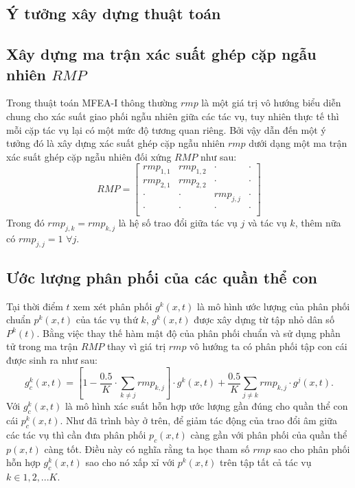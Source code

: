 \subsection{Ý tưởng xây dựng thuật toán}
\label{section:idea}
\subsection{Xây dựng ma trận xác suất ghép cặp ngẫu nhiên $RMP$}

Trong thuật toán MFEA-I thông thường $rmp$ là một giá trị vô hướng biểu diễn chung cho xác suất giao phối ngẫu nhiên giữa các tác vụ, tuy nhiên thực tế thì mỗi cặp tác vụ lại có một mức độ tương quan riêng. Bởi vậy dẫn đến một ý tưởng đó là xây dựng xác suất ghép cặp ngẫu nhiên $rmp$ dưới dạng một ma trận xác suất ghép cặp ngẫu nhiên đối xứng $RMP$ như sau:
\begin{equation}
    RMP =
    \begin{bmatrix}
        rmp_{1,1} & rmp_{1,2} & \cdot & \cdot \\
        rmp_{2,1} & rmp_{2,2} & \cdot & \cdot \\
        \cdot & \cdot & rmp_{j,j} & \cdot \\
        \cdot & \cdot & \cdot & \cdot \\
    \end{bmatrix}
\end{equation}
Trong đó $rmp_{j,k} = rmp_{k,j}$ là hệ số trao đổi giữa tác vụ $j$ và tác vụ $k$, thêm nữa có $rmp_{j,j} = 1$ $\forall j$. 
\subsection{Ước lượng phân phối của các quần thể con}
Tại thời điểm $t$ xem xét phân phối $g^k(x,t)$ là mô hình ước lượng của phân phối chuẩn $p^k(x,t)$ của tác vụ thứ $k$, $g^k(x,t)$ được xây dựng từ tập nhỏ dân số $P^k(t)$. Bằng việc thay thế hàm mật độ của phân phối chuẩn và sử dụng phần tử trong ma trận $RMP$ thay vì giá trị $rmp$ vô hướng ta có phân phối tập con cái được sinh ra như sau:
\begin{equation}
    g_c^k(x,t) = [1 - \frac{0.5}{K}\cdot \sum_{k \neq j}rmp_{k,j}] \cdot g^k(x,t) + \frac{0.5}{K} \sum_{j \neq k} rmp_{k,j} \cdot g^j(x,t).
    \label{equa:true_distribution}
\end{equation}
Với $g_c^k(x,t)$ là mô hình xác suất hỗn hợp ước lượng gần đúng cho quần thể con cái $p_c^k(x,t)$. Như đã trình bày ở trên, để giảm tác động của trao đổi âm giữa các tác vụ thì cần đưa phân phối $p_c(x,t)$ càng gần với phân phối của quần thể $p(x,t)$ càng tốt. Điều này có nghĩa rằng ta học tham số $rmp$ sao cho phân phối hỗn hợp $g_c^k(x,t)$ sao cho nó xấp xỉ với $p^k(x,t)$ trên tập tất cả tác vụ $k \in {1,2,...K}$.

